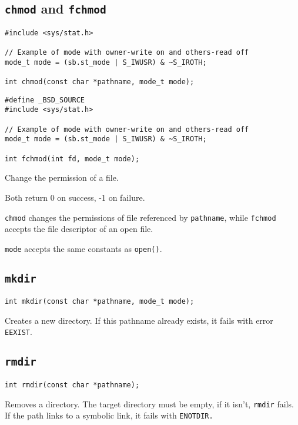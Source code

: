 \documentclass{article}
\begin{document}
\subsection{\texttt{chmod} and \texttt{fchmod}}

\begin{verbatim}
#include <sys/stat.h>

// Example of mode with owner-write on and others-read off
mode_t mode = (sb.st_mode | S_IWUSR) & ~S_IROTH;

int chmod(const char *pathname, mode_t mode);
\end{verbatim}

\begin{verbatim}
#define _BSD_SOURCE
#include <sys/stat.h>

// Example of mode with owner-write on and others-read off
mode_t mode = (sb.st_mode | S_IWUSR) & ~S_IROTH;

int fchmod(int fd, mode_t mode);
\end{verbatim}

Change the permission of a file.

Both return 0 on success, -1 on failure.

\texttt{chmod} changes the permissions of file referenced by \texttt{pathname}, while \texttt{fchmod} accepts the file descriptor of an open file.

\texttt{mode} accepts the same constants as \texttt{open()}.



\subsection{\texttt{mkdir}}


\begin{verbatim}
int mkdir(const char *pathname, mode_t mode);
\end{verbatim}

Creates a new directory. If this pathname already exists, it fails with error \texttt{EEXIST}.
\subsection{\texttt{rmdir}}

\begin{verbatim}
int rmdir(const char *pathname);
\end{verbatim}

Removes a directory. The target directory must be empty, if it isn't, \texttt{rmdir} fails. If the path links to a symbolic link, it fails with \texttt{ENOTDIR.}
\end{document}
